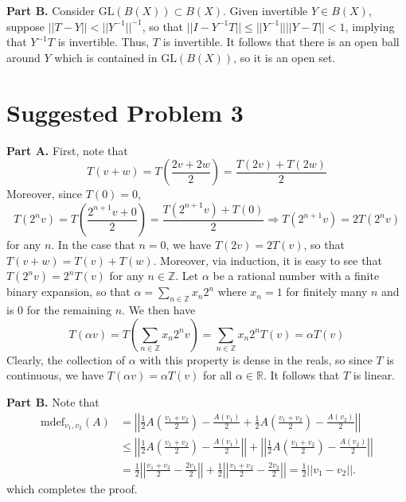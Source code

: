 \documentclass[aps,pra,showpacs,notitlepage,onecolumn,superscriptaddress,nofootinbib]{revtex4-1}
\theoremstyle{definition}
\begin{document}
\noindent \textbf{Part B.} Consider $\text{GL}(B(X)) \subset B(X)$. Given invertible $Y \in B(X)$, suppose $||T - Y|| < ||Y^{-1}||^{-1}$, so that $||I - Y^{-1} T|| \leq ||Y^{-1}|| ||Y - T|| < 1$,
implying that $Y^{-1} T$ is invertible. Thus, $T$ is invertible. It follows that there is an open ball around $Y$ which is contained in $\text{GL}(B(X))$, so it is an open set.

\section{Suggested Problem 3}

\noindent \textbf{Part A.} First, note that
\begin{equation}
  T(v + w) = T\left( \frac{2v + 2w}{2} \right) = \frac{T(2v) + T(2w)}{2}
\end{equation}
Moreover, since $T(0) = 0$,
\begin{equation}
  T(2^n v) = T\left(\frac{2^{n+1} v + 0}{2}\right) = \frac{T(2^{n + 1} v) + T(0)}{2} \Longrightarrow T(2^{n + 1} v) = 2T(2^{n} v)
\end{equation}
for any $n$. In the case that $n = 0$, we have $T(2v) = 2T(v)$, so that $T(v + w) = T(v) + T(w)$. Moreover, via induction, it is easy to see that $T(2^n v) = 2^n T(v)$ for any $n \in \mathbb{Z}$.
Let $\alpha$ be a rational number with a finite binary expansion, so that $\alpha = \sum_{n \in \mathbb{Z}} x_n 2^n$ where $x_n = 1$ for finitely many $n$ and is $0$ for the remaining $n$. We then have
\begin{equation}
  T(\alpha v) = T \left( \sum_{n \in \mathbb{Z}} x_n 2^n v \right) = \sum_{n \in \mathbb{Z}} x_n 2^n T(v) = \alpha T(v)
\end{equation}
Clearly, the collection of $\alpha$ with this property is dense in the reals, so since $T$ is continuous, we have $T(\alpha v) = \alpha T(v)$ for all $\alpha \in \mathbb{R}$. It follows that $T$ is linear.
\newline

\noindent \textbf{Part B.} Note that
\begin{align}
  \text{mdef}_{v_1, v_2}(A)& = \left|\left| \frac{1}{2} A\left( \frac{v_1 + v_2}{2} \right) - \frac{A(v_1)}{2} + \frac{1}{2} A \left( \frac{v_1 + v_2}{2} \right) - \frac{A(v_2)}{2} \right|\right|
  \\ & \leq \left|\left| \frac{1}{2} A\left( \frac{v_1 + v_2}{2} \right) - \frac{A(v_1)}{2} \right|\right| + \left|\left| \frac{1}{2} A \left( \frac{v_1 + v_2}{2} \right) - \frac{A(v_2)}{2} \right|\right|
  \\ & = \frac{1}{2} \left|\left| \frac{v_1 + v_2}{2} - \frac{2v_1}{2} \right|\right| + \frac{1}{2} \left|\left| \frac{v_1 + v_2}{2} - \frac{2v_2}{2} \right|\right| = \frac{1}{2} ||v_1 - v_2||.
\end{align}
which completes the proof.
\newline
\end{document}
